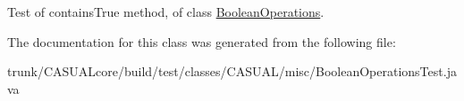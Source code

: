 Test of contains\-True method, of class \hyperlink{class_c_a_s_u_a_l_1_1misc_1_1_boolean_operations}{Boolean\-Operations}. 

The documentation for this class was generated from the following file\-:\begin{DoxyCompactItemize}
\item 
trunk/\-C\-A\-S\-U\-A\-Lcore/build/test/classes/\-C\-A\-S\-U\-A\-L/misc/Boolean\-Operations\-Test.\-java\end{DoxyCompactItemize}
